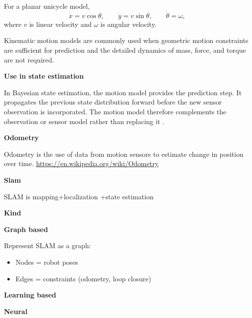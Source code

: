 \documentclass{book}
\providecommand{\ProjectDeepHeading}[2]{%
    \par\medskip\noindent\textbf{#2}\par\smallskip
}
\begin{document}
      For a planar unicycle model,
      \[
         \dot{x}=v\cos\ensuremath{\theta},
         \qquad
         \dot{y}=v\sin\ensuremath{\theta},
         \qquad
         \dot{\ensuremath{\theta}}=\ensuremath{\omega},
      \]
      where $v$ is linear velocity and $\ensuremath{\omega}$ is angular velocity.

      Kinematic motion models are commonly used when geometric motion constraints are sufficient for prediction and the detailed dynamics of mass, force, and torque are not required.

   \ProjectDeepHeading{10}{Use in state estimation}
      In Bayesian state estimation, the motion model provides the prediction step. It propagates the previous state distribution forward before the new sensor observation is incorporated. The motion model therefore complements the observation or sensor model rather than replacing it \cite{thrun-2005-probabilistic-robotics}.

\ProjectDeepHeading{6}{Odometry}


Odometry is the use of data from motion sensors to estimate change in position over time. \url{https://en.wikipedia.org/wiki/Odometry}

\ProjectDeepHeading{6}{Slam}


SLAM is mapping+localization +state estimation

\ProjectDeepHeading{7}{Kind}

\ProjectDeepHeading{8}{Graph based}


Represent SLAM as a graph:
    \begin{itemize}
        \item Nodes = robot poses
        \item Edges = constraints (odometry, loop closure)
    \end{itemize}

\ProjectDeepHeading{8}{Learning based}

\ProjectDeepHeading{9}{Neural}
\end{document}
